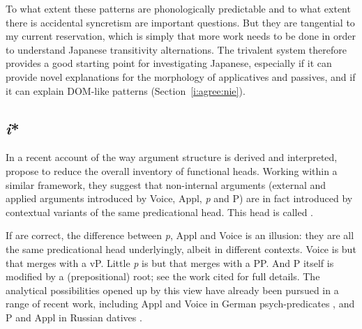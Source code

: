 \begin{exe}
\begin{xlist}
\begin{xlist}
\begin{xlist}
\begin{xlist}
\begin{xlist}
\begin{xlist}
\begin{exe}
\begin{xlist}
\begin{exe}
\begin{exe}
\begin{xlist}
\begin{exe}
\begin{exe}
\begin{xlist}
\begin{exe}
\begin{xlist}
\begin{exe}
\begin{xlist}
\begin{exe}
\begin{xlist}
To what extent these patterns are phonologically predictable and to what extent there is accidental syncretism are important questions. But they are tangential to my current reservation, which is simply that more work needs to be done in order to understand Japanese transitivity alternations. The trivalent system therefore provides a good starting point for investigating Japanese, especially if it can provide novel explanations for the morphology of applicatives and passives, and if it can explain DOM-like patterns (Section~\ref{i:agree:nie}).

	\subsection{\emph{i}*} \label{i:i:i}
In a recent account of the way argument structure is derived and interpreted, \cite{woodmarantz17} propose to reduce the overall inventory of functional heads. Working within a similar framework, they suggest that non-internal arguments (external and applied arguments introduced by Voice, Appl, \emph{p} and P) are in fact introduced by contextual variants of the same predicational head. This head is called \emph{}. 

If \cite{woodmarantz17} are correct, the difference between \emph{p}, Appl and Voice is an illusion: they are all the same predicational head underlyingly, albeit in different contexts. Voice is but \emph{} that merges with a vP. Little \emph{p} is but \emph{} that merges with a PP. And P itself is \emph{} modified by a (prepositional) root; see the work cited for full details. The analytical possibilities opened up by this view have already been pursued in a range of recent work, including Appl and Voice in German psych-predicates \citep{hirsch18phd}, and P and Appl in Russian datives \citep{bonehnash17}.


\end{xlist}
\end{exe}
\end{xlist}
\end{exe}
\end{xlist}
\end{exe}
\end{xlist}
\end{exe}
\end{exe}
\end{xlist}
\end{exe}
\end{exe}
\end{xlist}
\end{exe}
\end{xlist}
\end{xlist}
\end{xlist}
\end{xlist}
\end{xlist}
\end{xlist}
\end{exe}
